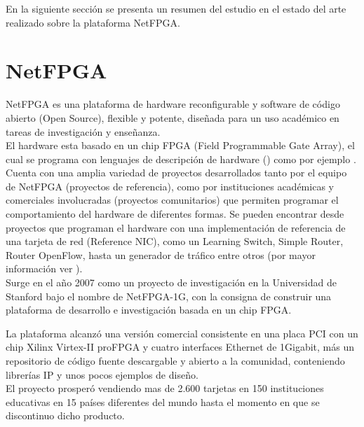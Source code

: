 
En la siguiente secci\'on se presenta un resumen del estudio en el estado del arte realizado sobre la plataforma NetFPGA.

\section{NetFPGA}
\label{section2.9}

NetFPGA\cite{NetFPGA1} es una plataforma de hardware reconfigurable y software de c\'odigo abierto (Open Source), flexible y potente, diseñada para un uso académico en tareas de investigación y enseñanza.\\

El hardware esta basado en un chip FPGA (Field Programmable Gate Array), el cual se programa con lenguajes de descripci\'on de hardware () como por ejemplo . Cuenta con una amplia variedad de proyectos desarrollados tanto por el equipo de NetFPGA (proyectos de referencia), como por instituciones académicas y comerciales involucradas (proyectos comunitarios) que permiten programar el comportamiento del hardware  de diferentes formas. Se pueden encontrar desde proyectos que programan el hardware con una implementación de referencia de una tarjeta de red (Reference NIC), como un Learning Switch, Simple Router, Router OpenFlow, hasta un generador de tr\'afico entre otros (por mayor informaci\'on ver \citep{NetFPGA2}).\\ 

Surge en el año 2007 como un proyecto de investigación en la Universidad de Stanford bajo el nombre de NetFPGA-1G, con la consigna de construir una plataforma de desarrollo e investigación basada en un chip FPGA.
 
La plataforma alcanz\'o una versi\'on comercial consistente en una placa PCI con un chip Xilinx Virtex-II proFPGA y cuatro interfaces Ethernet de 1Gigabit, m\'as un repositorio de código fuente descargable y abierto a la comunidad, conteniendo librerías IP y unos pocos ejemplos de diseño.\\

El proyecto prosper\'o vendiendo mas de 2.600 tarjetas en 150 instituciones educativas en 15 países diferentes del mundo hasta el momento en que se discontinuo dicho producto.\\

